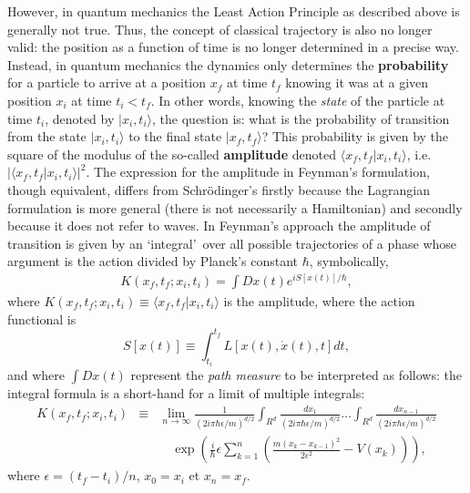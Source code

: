 \documentclass[12pt,aps,prb,preprint]{revtex4-1}   %
\begin{document}
However, in quantum mechanics the Least Action Principle as
described above is generally not true. Thus, the concept of
classical trajectory is also no longer valid: the position as a
function of time is no longer determined in a precise way.
Instead, in quantum mechanics the dynamics only determines the
\textbf{probability} for a particle to arrive at a position $x_f$
at time $t_f$ knowing it was at a given position $x_i$ at time
$t_i<t_f$. In other words, knowing the \textit{state} of the
particle at time $t_i$, denoted by $|x_i,t_i\rangle$, the question
is: what is the probability of transition from the state
$|x_i,t_i\rangle $ to the final state $|x_f,t_f \rangle$? This
probability is given by the square of the modulus of the so-called
\textbf{amplitude} denoted $ \langle x_f,t_f|x_i,t_i \rangle$,
i.e. $|\langle x_f,t_f|x_i,t_i \rangle|^2$. The expression for the
amplitude in Feynman's formulation, though equivalent, differs
from Schr\"odinger's firstly because the Lagrangian formulation is
more general (there is not necessarily a Hamiltonian) and secondly
because it does not refer to waves. In Feynman's approach the
amplitude of transition is given by an \lq integral\rq\ over all
possible trajectories of a phase whose argument is the action
divided by Planck's constant $\hbar$, symbolically,
\begin{eqnarray*}
K(x_f,t_f;x_i,t_i) = \int Dx(t) e^{i S[x(t)]/\hbar},
\end{eqnarray*}
where $K(x_f,t_f;x_i,t_i) \equiv \langle x_f,t_f|x_i,t_i
\rangle$ is the amplitude, where the action functional is
$$ S[x(t)]\equiv\int_{t_i}^{t_f} L[x(t),\dot{x}(t),t]dt, $$ and where
$\int Dx(t)$ represent the \textit{path measure} to be interpreted
as follows: the integral formula is a short-hand for a limit of
multiple integrals:
\begin{eqnarray}\label{Klim}
K(x_f,t_f;x_i,t_i) &\equiv& \lim_{n\rightarrow\infty}
\frac{1}{(2i\pi \hbar\epsilon/m)^{d/2}}
\int_{R^d}\frac{dx_1}{(2i\pi \hbar\epsilon/m)^{d/2}}
\ldots\int_{R^d}\frac{dx_{n-1}}{(2i\pi \hbar\epsilon/m)^{d/2}}
{}\nonumber{}\\&& \quad \exp{\left(\frac{i}{\hbar}\epsilon
\sum_{k=1}^{n}(\frac{m(x_{k}-x_{k-1})^2}{2\epsilon^2}-V(x_k))
\right)},
\end{eqnarray}
where $\epsilon=(t_f-t_i)/n$, $x_0 = x_i$ et $x_n = x_f$.
\end{document}
